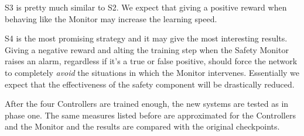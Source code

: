 S3 is pretty much similar to S2. We expect that giving a positive reward when behaving like the Monitor may increase the learning speed.

S4 is the most promising strategy and it may give the most interesting results. Giving a negative reward and alting the training step when the Safety Monitor raises an alarm, regardless if it's a true or false positive, should force the network to completely \textsl{avoid} the situations in which the Monitor intervenes. Essentially we expect that the effectiveness of the safety component will be drastically reduced.\newline

After the four Controllers are trained enough, the new systems are tested as in phase one. The same measures listed before are approximated for the Controllers and the Monitor and the results are compared with the original checkpoints.

